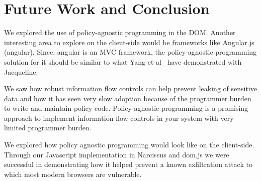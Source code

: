 \chapter{Future Work and Conclusion}
We explored the use of policy-agnostic programming in the DOM. Another interesting
area to explore on the client-side would be frameworks like Angular.js (angular).
Since, angular is an MVC framework, the policy-agnostic programming solution for it
should be similar to what Yang et al~\cite{Jacqueline} have demonstrated with Jacqueline.

We saw how robust information flow controls can help prevent leaking of sensitive
data and how it has seen very slow adoption because of the programmer burden to
write and maintain policy code. Policy-agnostic programming is a promising approach
to implement information flow controls in your system with very limited programmer
burden.

We explored how policy agnostic programming would look like on the client-side.
Through our Javascript implementation in Narcissus and dom.js we were successful
in demonstrating how it helped prevent a known exfiltration attack to which most
modern browsers are vulnerable.
